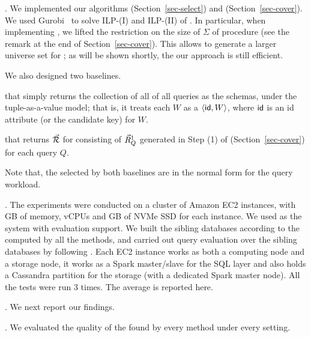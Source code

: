 {. We implemented our algorithms \opts
(Section~\ref{sec-select}) and \usc (Section~\ref{sec-cover}). We
used Gurobi~\cite{gurobi} to solve ILP-(I) and ILP-(II) of \opts.
In particular, when implementing \usc, we lifted the restriction
on the size of $\Sigma$ of procedure \decompose (see the remark
at the end of Section~\ref{sec-cover}). This allows \usc to
generate a larger universe set for \opts; as will be shown
shortly, the our approach is still efficient. 

\vspace{0.7ex}
We also designed two baselines.

\vspace{-0.4ex}
 that simply returns the collection
of all \qcs of all queries as the schemas, under the
tuple-as-a-value model; that is, it treats each \qcs $W$ as a \bs
$\langle \protect\mathsf{id},\allowbreak W\rangle$, where $\protect\mathsf{id}$ is an id attribute (or
the candidate key) for $W$.

\vspace{-0.4ex}
 that returns $\vec{{\mathcal R}}$ for
consisting of $\vec{R}_{Q}^{1}$ generated in Step (1)
of \usc (Section~\ref{sec-cover}) for each query $Q$.

\vspace{0.4ex}
Note that, the \bdss selected by both baselines are in the normal
form for the query workload. 

.
The experiments were conducted on a cluster of  Amazon
EC2  instances, with GB of memory, 
vCPUs and GB of NVMe SSD for each instance.
We used  as the \kv
system with \SQL evaluation support.
We built the sibling databases according to the computed \bdss by
all the methods, and carried out query evaluation over the
sibling \baav databases by following \cite{VLDB19}. 
Each EC2 instance works as both a computing node and a storage node, \ie it works
as a Spark master/slave for the SQL layer and also holds a
Cassandra partition for the storage (with a dedicated Spark
master node).
All the tests were run 3 times. The average is reported here.


. We next report our findings.

.
We evaluated the quality of the \bdss found by every method under
every setting. 

}
